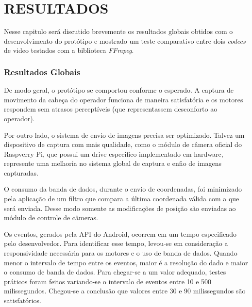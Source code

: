 
\chapter{RESULTADOS}
\label{chap:resultados}

Nesse capitulo será discutido brevemente os resultados globais obtidos com o desenvolvimento do protótipo e mostrado um teste comparativo entre dois \textit{codecs} de video testados com a biblioteca \textit{FFmpeg}.\par

\subsection{Resultados Globais}
\label{subsec:resglobais}

De modo geral, o protótipo se comportou conforme o esperado. A captura de movimento da cabeça do operador funciona de maneira satisfatória e os motores respondem sem atrasos perceptíveis (que representassem desconforto ao operador).\par

Por outro lado, o sistema de envio de imagens precisa ser optimizado. Talvez um dispositivo de captura com mais qualidade, como o módulo de câmera oficial do Raspverry Pi, que possui um drive especifico implementado em hardware, represente uma melhoria no sistema global de captura e enfio de imagens capturadas.\par

O consumo da banda de dados, durante o envio de coordenadas, foi minimizado pela aplicação de um filtro que compara a última coordenada válida com a que será enviada. Desse modo somente as modificações de posição são enviadas ao módulo de controle de câmeras.\par

Os eventos, gerados pela API do Android, ocorrem em um tempo especificado pelo desenvolvedor. Para identificar esse tempo, levou-se em consideração a responsividade necessária para os motores e o uso de banda de dados. Quando menor o intervalo de tempo entre os eventos, maior é a resolução do dado e maior o consumo de banda de dados. Para chegar-se a um valor adequado, testes práticos foram feitos variando-se o intervalo de eventos entre 10 e 500 milissegundos. Chegou-se a conclusão que valores entre 30 e 90 milissegundos são satisfatórios.\par

